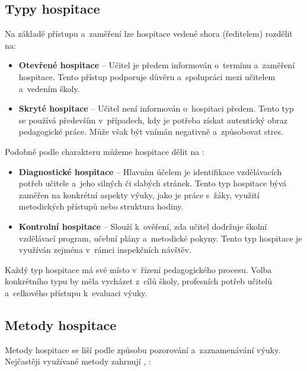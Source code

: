 \subsection{Typy hospitace}

Na základě přístupu a~zaměření lze hospitace vedené shora (ředitelem) rozdělit na:

\begin{itemize}
    \item \textbf{Otevřené hospitace} – Učitel je předem informován o~termínu a~zaměření hospitace. Tento přístup podporuje důvěru a~spolupráci mezi učitelem a~vedením školy.
    \item \textbf{Skryté hospitace} – Učitel není informován o~hospitaci předem. Tento typ se používá především v~případech, kdy je potřeba získat autentický obraz pedagogické práce. Může však být vnímán negativně a~způsobovat stres.
\end{itemize}

Podobně podle charakteru můžeme hospitace dělit na :
\begin{itemize}
    \item \textbf{Diagnostické hospitace} – Hlavním účelem je identifikace vzdělávacích potřeb učitele a~jeho silných či slabých stránek. Tento typ hospitace bývá zaměřen na konkrétní aspekty výuky, jako je práce s~žáky, využití metodických přístupů nebo struktura hodiny.
    \item \textbf{Kontrolní hospitace} – Slouží k~ověření, zda učitel dodržuje školní vzdělávací program, učební plány a~metodické pokyny. Tento typ hospitace je využíván zejména v~rámci inspekčních návštěv.
\end{itemize}

Každý typ hospitace má své místo v~řízení pedagogického procesu. Volba konkrétního typu by měla vycházet z~cílů školy, profesních potřeb učitelů a~celkového přístupu k~evaluaci výuky.

\subsection{Metody hospitace}

Metody hospitace se liší podle způsobu pozorování a~zaznamenávání výuky. Nejčastěji využívané metody zahrnují \cite{nastroje-hodnoceni}, \cite{ped-proces-rizeni}:

